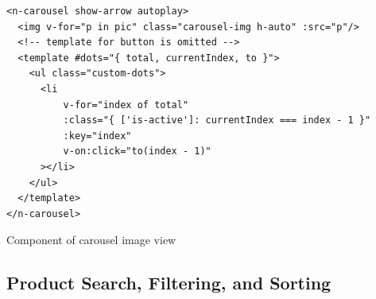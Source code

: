 \documentclass{article}
\begin{document}
\begin{listing}[!htp]
\begin{verbatim}
<n-carousel show-arrow autoplay>
  <img v-for="p in pic" class="carousel-img h-auto" :src="p"/>
  <!-- template for button is omitted -->
  <template #dots="{ total, currentIndex, to }">
    <ul class="custom-dots">
      <li
          v-for="index of total"
          :class="{ ['is-active']: currentIndex === index - 1 }"
          :key="index"
          v-on:click="to(index - 1)"
      ></li>
    </ul>
  </template>
</n-carousel>
\end{verbatim}
\caption{Component of carousel image view}
\label{listing:carousel}
\end{listing}


\subsection{Product Search, Filtering, and Sorting}
\end{document}
